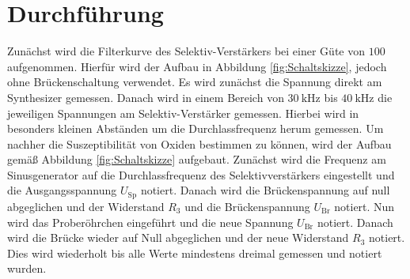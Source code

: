 
\section{Durchführung}
\label{sec:Durchführung}

Zunächst wird die Filterkurve des Selektiv-Verstärkers bei einer Güte von $100$ aufgenommen. Hierfür wird der Aufbau in Abbildung \ref{fig:Schaltskizze}, jedoch ohne Brückenschaltung verwendet. Es wird zunächst die Spannung direkt am Synthesizer gemessen. Danach wird in einem Bereich von $\SI{30}{\kilo\hertz}$ bis $\SI{40}{\kilo\hertz}$ die jeweiligen Spannungen am Selektiv-Verstärker gemessen. Hierbei wird in besonders kleinen Abständen um die Durchlassfrequenz herum gemessen. Um nachher die Suszeptibilität von Oxiden bestimmen zu können, wird der Aufbau gemäß Abbildung \ref{fig:Schaltskizze} aufgebaut. Zunächst wird die Frequenz am Sinusgenerator auf die Durchlassfrequenz des Selektivverstärkers eingestellt und die Ausgangsspannung $U_\text{Sp}$ notiert. Danach wird die Brückenspannung auf null abgeglichen und der Widerstand $R_3$ und die Brückenspannung $U_\text{Br}$ notiert. Nun wird das Proberöhrchen eingeführt und die neue Spannung $U_\text{Br}$ notiert. Danach wird die Brücke wieder auf Null abgeglichen und der neue Widerstand $R_3$ notiert. Dies wird wiederholt bis alle Werte mindestens dreimal gemessen und notiert wurden.